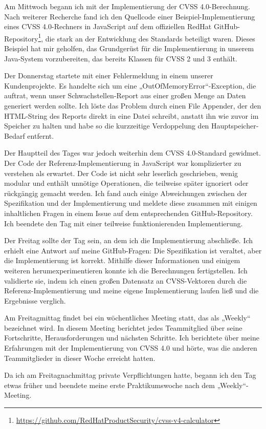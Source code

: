 Am Mittwoch begann ich mit der Implementierung der CVSS 4.0-Berechnung.
Nach weiterer Recherche fand ich den Quellcode einer Beispiel-Implementierung eines CVSS 4.0-Rechners in JavaScript auf dem offiziellen RedHat GitHub-Repository\footnote{\url{https://github.com/RedHatProductSecurity/cvss-v4-calculator}}, die stark an der Entwicklung des Standards beteiligt waren.
Dieses Beispiel hat mir geholfen, das Grundgerüst für die Implementierung in unserem Java-System vorzubereiten, das bereits Klassen für CVSS 2 und 3 enthält.

Der Donnerstag startete mit einer Fehlermeldung in einem unserer Kundenprojekte.
Es handelte sich um eine „OutOfMemoryError“-Exception, die auftrat, wenn unser Schwachstellen-Report aus einer großen Menge an Daten generiert werden sollte.
Ich löste das Problem durch einen File Appender, der den HTML-String des Reports direkt in eine Datei schreibt, anstatt ihn wie zuvor im Speicher zu halten und habe so die kurzzeitige Verdoppelung den Hauptspeicher-Bedarf entfernt.

Der Hauptteil des Tages war jedoch weiterhin dem CVSS 4.0-Standard gewidmet.
Der Code der Referenz-Implementierung in JavaScript war komplizierter zu verstehen als erwartet.
Der Code ist nicht sehr leserlich geschrieben, wenig modular und enthält unnötige Operationen, die teilweise später ignoriert oder rückgängig gemacht werden.
Ich fand auch einige Abweichungen zwischen der Spezifikation und der Implementierung und meldete diese zusammen mit einigen inhaltlichen Fragen in einem Issue auf dem entsprechenden GitHub-Repository.
Ich beendete den Tag mit einer teilweise funktionierenden Implementierung.

Der Freitag sollte der Tag sein, an dem ich die Implementierung abschließe.
Ich erhielt eine Antwort auf meine GitHub-Fragen: Die Spezifikation ist veraltet, aber die Implementierung ist korrekt.
Mithilfe dieser Informationen und einigem weiteren herumexperimentieren konnte ich die Berechnungen fertigstellen.
Ich validierte sie, indem ich einen großen Datensatz an CVSS-Vektoren durch die Referenz-Implementierung und meine eigene Implementierung laufen ließ und die Ergebnisse verglich.

Am Freitagmittag findet bei \metaeffekt ein wöchentliches Meeting statt, das als „Weekly“ bezeichnet wird.
In diesem Meeting berichtet jedes Teammitglied über seine Fortschritte, Herausforderungen und nächsten Schritte.
Ich berichtete über meine Erfahrungen mit der Implementierung von CVSS 4.0 und hörte, was die anderen Teammitglieder in dieser Woche erreicht hatten.

Da ich am Freitagnachmittag private Verpflichtungen hatte, begann ich den Tag etwas früher und beendete meine erste Praktikumswoche nach dem „Weekly“-Meeting.